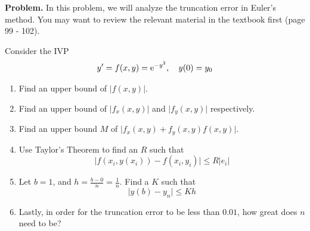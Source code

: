 \documentclass[10pt]{article}
\title{}
\date{}
\newcommand{\e}{{\rm e}}
\newcommand{\abs}[1]{\lvert #1 \rvert}
\begin{document}
\noindent
{\bf Problem.} In this problem, we will analyze the truncation error in Euler's method. You may want to review the relevant material in the textbook first (page 99 - 102).

Consider the IVP 
\[
y' = f(x,y) = \e^{-y^2},\quad y(0) = y_0
\]
\begin{enumerate}
\item
Find an upper bound of $\abs{f(x,y)}$.
\item Find an upper bound of $\abs{f_x(x,y)}$ and $\abs{f_y(x,y)}$ respectively.
\item Find an upper bound $M$ of $\abs{f_x(x,y) + f_y(x,y)f(x,y)}$.
\clearpage
\item Use Taylor's Theorem to find an $R$ such that
\[
\abs{f(x_i,y(x_i)) - f(x_i,y_i)}\leq R\abs{e_i}
\]
\item Let $b = 1$, and $\displaystyle h = \frac{b - 0}{n} = \frac{1}{n}$. Find a $K$ such that
\[
\abs{y(b) - y_n} \leq Kh
\]
\item Lastly, in order for the truncation error to be less than $0.01$, how great does $n$ need to be?
\end{enumerate}
\end{document}

